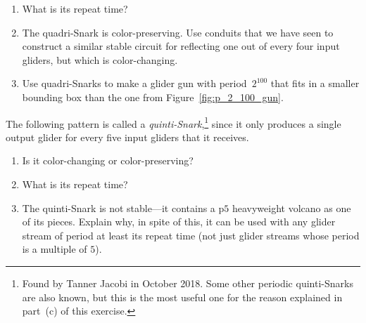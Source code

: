 \begin{multicols}{2}
\begin{problem}
		\begin{center}
		\end{center}
		
		\begin{enumerate}[label=\bf\color{ocre}(\alph*)]
			\item {} What is its repeat time?%
			
			\item {} The quadri-Snark is color-preserving. Use conduits that we have seen to construct a similar stable circuit for reflecting one out of every four input gliders, but which is color-changing.%
			
			\item {} Use quadri-Snarks to make a glider gun with period~$2^{100}$ that fits in a smaller bounding box than the one from Figure~\ref{fig:p_2_100_gun}.
		\end{enumerate}
	\end{problem}
	
	
	\mfilbreak
	
	
	\begin{problem}\label{exer:quinti_snark}
		The following pattern is called a \emph{quinti-Snark},\footnote{Found by Tanner Jacobi in October 2018. Some other periodic quinti-Snarks are also known, but this is the most useful one for the reason explained in part~(c) of this exercise.} since it only produces a single output glider for every five input gliders that it receives.
		
		\begin{center}
		\end{center}
		
		\begin{enumerate}[label=\bf\color{ocre}(\alph*)]
			\item {} Is it color-changing or color-preserving?%
			
			\item {} What is its repeat time?
			
			\item {} The quinti-Snark is not stable---it contains a p$5$ heavyweight volcano as one of its pieces. Explain why, in spite of this, it can be used with any glider stream of period at least its repeat time (not just glider streams whose period is a multiple of $5$).
		\end{enumerate}
	\end{problem}
	

\end{multicols}
